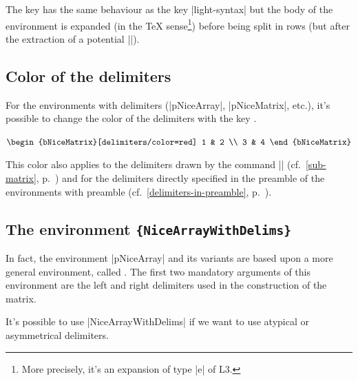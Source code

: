 \documentclass[dvipsnames]{article}
\begin{document}
\medskip
{}

The key  has the same behaviour as the key
|light-syntax| but the body of the environment is expanded (in the TeX
sense\footnote{More precisely, it's an expansion of type |e| of L3.}) before being
split in rows (but after the extraction of a potential |\CodeAfter|).


\subsection{Color of the delimiters}



For the environments with delimiters (|{pNiceArray}|, |{pNiceMatrix}|, etc.),
it's possible to change the color of the delimiters with the key
.

\medskip
\begin{Code}[width=12cm,show-output]
$\begin{bNiceMatrix}[delimiters/color=red]
  1 & 2 \\
  3 & 4 
\end{bNiceMatrix}$
\end{Code}

\medskip
This color also applies to the delimiters drawn by the command |\SubMatrix|
(cf.~\ref{sub-matrix}, p.~\pageref{sub-matrix}) and for the delimiters directly specified in the
preamble of the environments with preamble (cf.~\ref{delimiters-in-preamble},
p.~\pageref{delimiters-in-preamble}). 

\subsection{The environment \texttt{\{NiceArrayWithDelims\}}}

\label{NiceArrayWithDelims}

In fact, the environment |{pNiceArray}| and its variants are based upon a
more general environment, called . The first
two mandatory arguments of this environment are the left and right delimiters
used in the construction of the matrix. 

It's possible to use |{NiceArrayWithDelims}| if we want to use atypical or
asymmetrical delimiters.
\end{document}
